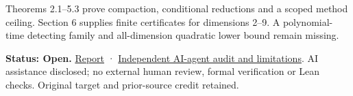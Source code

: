 \documentclass[11pt,a4paper]{article}
\begin{document}
Theorems 2.1--5.3 prove compaction, conditional reductions and a scoped
method ceiling. Section 6 supplies finite certificates for dimensions
2--9. A polynomial-time detecting family and all-dimension quadratic
lower bound remain missing.

\textbf{Status: Open.}
\href{https://github.com/ajt60gaibb/OpenProblemsInNLA/blob/main/references/holden-ac-2026-09-14/AC-06-submission.pdf}{Report}
·
\href{https://github.com/ajt60gaibb/OpenProblemsInNLA/blob/main/references/holden-ac-2026-09-14/verification/review-ac05-ac06.md}{Independent
AI-agent audit and limitations}. AI assistance disclosed; no external
human review, formal verification or Lean checks. Original target and
prior-source credit retained.
\end{document}

